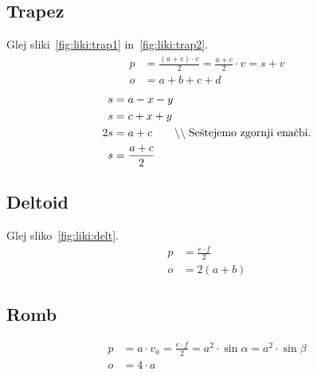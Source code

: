 \documentclass[a4paper,oneside,12pt,fleqn]{article}
\newcommand\krat\cdot
\newcommand{\comment}[1]{\ensuremath{\qquad\backslash\backslash\;}\textnormal{#1}}
\numberwithin{equation}{section}
\begin{document}
\parbox[t]{0.5\textwidth}{
\subsection{Trapez}
\label{sec:liki:trap}
Glej sliki~\ref{fig:liki:trap1} in~\ref{fig:liki:trap2}.
\begin{align*}
  p &=  \frac{(a+c)\krat v}{2} = \frac{a+c}{2} \krat v = s + v \\
  o &=  a + b + c + d
\end{align*}
\begin{align*}
  s &=  a - x - y \\
  s &=  c + x + y \\
   2s &=  a+c \comment{Seštejemo zgornji enačbi.}\\
  s &= \frac{a+c}{2}
\end{align*}

\subsection{Deltoid}
\label{sec:liki:delt}
Glej sliko~\ref{fig:liki:delt}.
\begin{align*}
  p &= \frac{e\krat f}{2} \\
  o &= 2(a+b)
\end{align*}

\subsection{Romb}
\label{sec:liki:romb}
\begin{align*}
  p &=  a\krat v_a = \frac{e\krat f}{2} = a^2\krat\sin\alpha = a^2\krat\sin\beta \\
  o &=  4\krat a
\end{align*}
}
\end{document}
